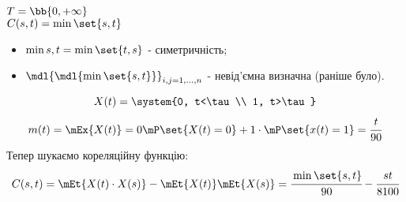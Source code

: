 \begin{exs}
$T = \bb{0,+\infty}$\\
$C(s,t) = \min\set{s,t}$\\
\begin{itemize}
\item $\min{s,t} = \min\set{t,s}$ - симетричність;
\item $\mdl{\mdl{\min\set{s,t}}}_{i,j=1,\ldots,n}$ - невід’ємна визначна (раніше було).
\end{itemize}
\end{exs}
\begin{exs}
\begin{equation}
X(t) = \system{0, t<\tau \\ 1, t>\tau}
\end{equation}
\begin{equation}
m(t) = \mEx{X(t)} = 0 \mP\set{X(t)=0} + 1\cdot \mP\set{x(t) = 1} = \cfrac t{90}
\end{equation}
Тепер шукаємо кореляційну функцію:
\begin{equation}
C(s,t) = \mEt{X(t)\cdot X(s)} - \mEt{X(t)} \mEt{X(s)} = \cfrac{\min\set{s,t}}{90} - \cfrac{st}{8100}
\end{equation}
\end{exs}